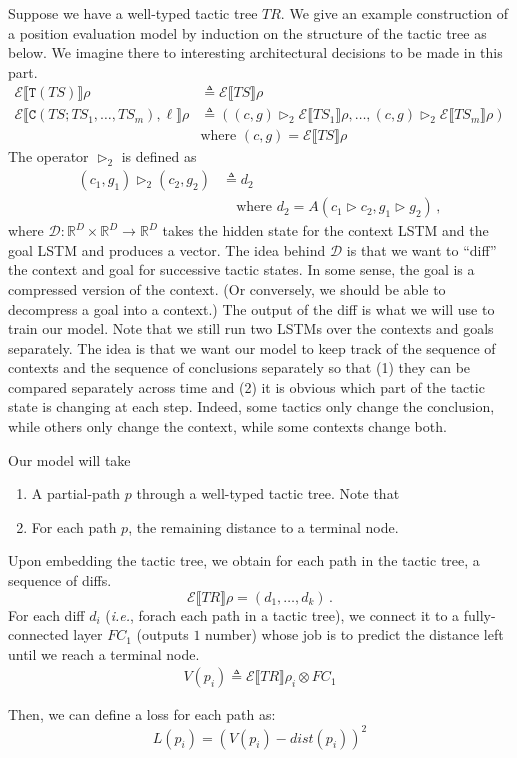 \documentclass{article}
\newcommand\ie{\textit{i.e.}}
\newcommand{\R}{\mathbb{R}}
\newcommand\mD{\mathcal{D}}
\newcommand\mE{\mathcal{E}}
\newcommand{\eqdef}[0]{\triangleq}
\newcommand\denote[1]{\llbracket#1\rrbracket}
\newcommand\env{\rho}
\newcommand\embedenv[1]{\mE\denote{#1}\env}
\begin{document}
Suppose we have a well-typed tactic tree $TR$. We give an example
construction of a position evaluation model by induction on the
structure of the tactic tree as below. We imagine there to interesting
architectural decisions to be made in this part.
\begin{align*}
  \embedenv{\texttt{T}(TS)} & \eqdef \embedenv{TS} \\
  \embedenv{\texttt{C}(TS; TS_1, \dots, TS_m), \ell} & \eqdef ((c, g) \rhd_2 \embedenv{TS_1}, \dots, (c, g) \rhd_2 \embedenv{TS_m}) \\
  & \mbox{where $(c, g) = \embedenv{TS}$}
\end{align*}
The operator $\rhd_2$ is defined as
\begin{align*}
  (c_1, g_1) \rhd_2 (c_2, g_2) & \eqdef d_2 \\
  & \quad \mbox{where $d_2 = A(c_1 \rhd c_2, g_1 \rhd g_2)$} \,,
\end{align*}
where $\mD: \R^D \times \R^D \rightarrow \R^D$ takes the hidden state for the context
LSTM and the goal LSTM and produces a vector. The idea behind $\mD$ is
that we want to ``diff'' the context and goal for successive tactic
states.  In some sense, the goal is a compressed version of the
context. (Or conversely, we should be able to decompress a goal into a
context.) The output of the diff is what we will use to train our
model. Note that we still run two LSTMs over the contexts and goals
separately. The idea is that we want our model to keep track of the
sequence of contexts and the sequence of conclusions separately so
that (1) they can be compared separately across time and (2) it is
obvious which part of the tactic state is changing at each
step. Indeed, some tactics only change the conclusion, while others
only change the context, while some contexts change both.

Our model will take
\begin{enumerate}
\item A partial-path $p$ through a well-typed tactic tree. Note that
\item For each path $p$, the remaining distance to a terminal node.
\end{enumerate}
Upon embedding the tactic tree, we obtain for each path in the
tactic tree, a sequence of diffs.
\[
\embedenv{TR} = (d_1, \dots, d_k) \,.
\]
For each diff $d_i$ (\ie, forach each path in a tactic tree), we
connect it to a fully-connected layer $FC_1$ (outputs $1$ number)
whose job is to predict the distance left until we reach a terminal
node.
\begin{align*}
  V(p_i) \eqdef \embedenv{TR}_i \otimes FC_1
\end{align*}

Then, we can define a loss for each path as:
\[
L(p_i) = (V(p_i) - \textit{dist}(p_i))^2
\]
\end{document}
